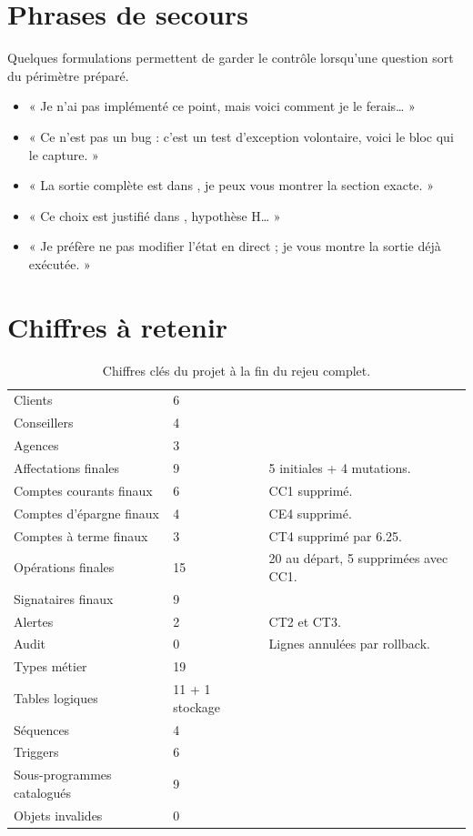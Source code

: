 \section{Phrases de secours}

Quelques formulations permettent de garder le contrôle lorsqu'une question
sort du périmètre préparé.

\begin{itemize}
  \item « Je n'ai pas implémenté ce point, mais voici comment je le ferais… »
  \item « Ce n'est pas un bug : c'est un test d'exception volontaire, voici le
        bloc qui le capture. »
  \item « La sortie complète est dans , je peux vous montrer
        la section exacte. »
  \item « Ce choix est justifié dans , hypothèse
        H… »
  \item « Je préfère ne pas modifier l'état en direct ; je vous montre la
        sortie déjà exécutée. »
\end{itemize}

\section{Chiffres à retenir}

\begin{table}[htbp]
  \centering
  \small
  \caption{Chiffres clés du projet à la fin du rejeu complet.}
  \label{tab:chiffres-cles}
  \begin{tabularx}{\textwidth}{@{}L{7.0cm}C{3.0cm}X@{}}
    \toprule
     &  &  \\
    \midrule
    Clients & 6 & \\
    Conseillers & 4 & \\
    Agences & 3 & \\
    Affectations finales & 9 & 5 initiales + 4 mutations. \\
    Comptes courants finaux & 6 & CC1 supprimé. \\
    Comptes d'épargne finaux & 4 & CE4 supprimé. \\
    Comptes à terme finaux & 3 & CT4 supprimé par 6.25. \\
    Opérations finales & 15 & 20 au départ, 5 supprimées avec CC1. \\
    Signataires finaux & 9 & \\
    Alertes & 2 & CT2 et CT3. \\
    Audit & 0 & Lignes annulées par rollback. \\
    Types métier & 19 & \\
    Tables logiques & 11 + 1 stockage & \\
    Séquences & 4 & \\
    Triggers & 6 & \\
    Sous-programmes catalogués & 9 & \\
    Objets invalides & 0 & \\
    \bottomrule
  \end{tabularx}
\end{table}

